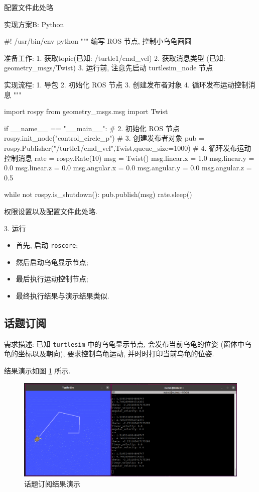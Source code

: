 \documentclass[openany, fontset=windowsold]{ctexbook}
\theoremstyle{kaiti}
\theoremstyle{normal}
\begin{document}
配置文件此处略

实现方案B: Python

\begin{python}
  #! /usr/bin/env python
  """
      编写 ROS 节点, 控制小乌龟画圆

      准备工作:
          1. 获取topic(已知: /turtle1/cmd_vel)
          2. 获取消息类型 (已知: geometry_msgs/Twist)
          3. 运行前, 注意先启动 turtlesim_node 节点

      实现流程:
          1. 导包
          2. 初始化 ROS 节点
          3. 创建发布者对象
          4. 循环发布运动控制消息
  """

  import rospy
  from geometry_msgs.msg import Twist

  if __name__ == "__main__":
      # 2. 初始化 ROS 节点
      rospy.init_node("control_circle_p")
      # 3. 创建发布者对象
      pub = rospy.Publisher("/turtle1/cmd_vel",Twist,queue_size=1000)
      # 4. 循环发布运动控制消息
      rate = rospy.Rate(10)
      msg = Twist()
      msg.linear.x = 1.0
      msg.linear.y = 0.0
      msg.linear.z = 0.0
      msg.angular.x = 0.0
      msg.angular.y = 0.0
      msg.angular.z = 0.5

      while not rospy.is_shutdown():
          pub.publish(msg)
          rate.sleep()
\end{python}

权限设置以及配置文件此处略.

3. 运行

\begin{itemize}
  \item 首先, 启动 \verb|roscore|; 
  \item 然后启动乌龟显示节点; 
  \item 最后执行运动控制节点; 
  \item 最终执行结果与演示结果类似.
\end{itemize}

\subsection{话题订阅}

需求描述: 已知 \verb|turtlesim| 中的乌龟显示节点, 会发布当前乌龟的位姿 (窗体中乌龟的坐标以及朝向), 要求控制乌龟运动, 并时时打印当前乌龟的位姿.

结果演示如图 \ref{fig:ros_demo_subscribe_topic} 所示.

\begin{figure}[!ht]
  \centering
  \includegraphics[width=.9\textwidth]{ros_demo_subscribe_topic.png}
  \caption{话题订阅结果演示}
  \label{fig:ros_demo_subscribe_topic}
\end{figure}
\end{document}
